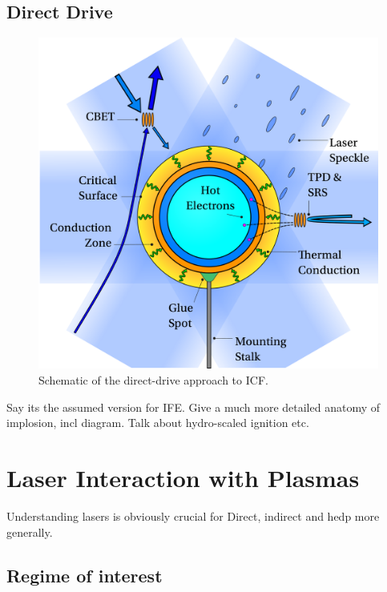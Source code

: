 \subsection{Direct Drive}%
\label{sec:intro_direct}

\begin{figure}[t!]
    \includegraphics[width=0.7\linewidth]{Introduction/Images/direct icf white.png}
    \centering
    \caption{Schematic of the direct-drive approach to \ac{ICF}.
    }%
    \label{fig:intro_direct}
\end{figure}

Say its the assumed version for IFE.
Give a much more detailed anatomy of implosion, incl diagram.
Talk about hydro-scaled ignition etc.

\section{Laser Interaction with Plasmas}%
\label{sec:intro_laserplasmas}

Understanding lasers is obviously crucial for Direct, indirect and hedp more generally.

\subsection{Regime of interest}%
\label{sec:intro_laser_regime}

